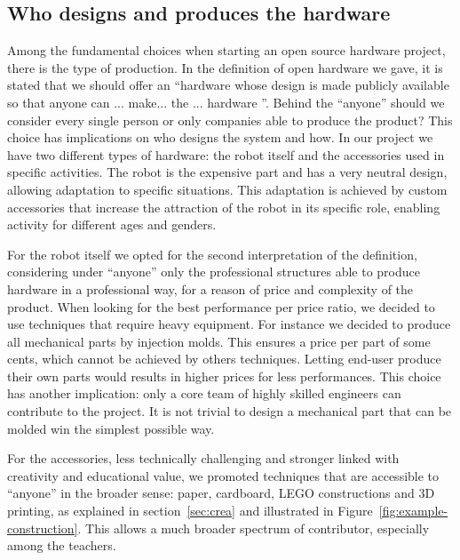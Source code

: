 \documentclass[letterpaper, 10 pt, conference]{ieeeconf}  %
\begin{document}
\subsection{Who designs and produces the hardware}

Among the fundamental choices when starting an open source hardware project, there is the type of production. 
In the definition of open hardware we gave, it is stated that we should offer an ``hardware whose design is made publicly available so that anyone can ... make... the ... hardware ''.
Behind the ``anyone'' should we consider every single person or only companies able to produce the product?
This choice has implications on who designs the system and how.
In our project we have two different types of hardware: the robot itself and the accessories used in specific activities.
The robot is the expensive part and has a very neutral design, allowing adaptation to specific situations.
This adaptation is achieved by custom accessories that increase the attraction of the robot in its specific role, enabling activity for different ages and genders.

For the robot itself we opted for the second interpretation of the definition, considering under ``anyone'' only the professional structures able to produce hardware in a professional way, for a reason of price and complexity of the product. 
When looking for the best performance per price ratio, we decided to use techniques that require heavy equipment.
For instance we decided to produce all mechanical parts by injection molds. 
This ensures a price per part of some cents, which cannot be achieved by others techniques.
Letting end-user produce their own parts would results in higher prices for less performances. 
This choice has another implication: only a core team of highly skilled engineers can contribute to the project. 
It is not trivial to design a mechanical part that can be molded win the simplest possible way.

For the accessories, less technically challenging and stronger linked with creativity and educational value, we promoted techniques that are accessible to ``anyone'' in the broader sense: paper, cardboard, LEGO constructions and 3D printing, as explained in section~\ref{sec:crea} and illustrated in Figure~\ref{fig:example-construction}.
This allows a much broader spectrum of contributor, especially among the teachers.
\end{document}
